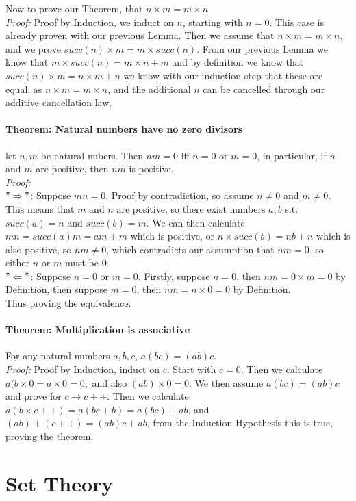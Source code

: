 \documentclass[]{scrbook}
\begin{document}
Now to prove our Theorem, that $n\times m = m\times n$\\
\textit{Proof:} Proof by Induction, we induct on $n$, starting with $n=0$. This case is already proven with our previous Lemma. Then we assume that $n\times m = m \times n$, and we prove $succ(n)\times m = m\times succ(n)$. From our previous Lemma we know that $m \times succ(n) = m\times n + m$ and by definition we know that $succ(n) \times m = n\times m + n$ we know with our induction step that these are equal, as $n\times m = m\times n$, and the additional $n$ can be cancelled through our additive cancellation law.

\subsubsection*{Theorem: Natural numbers have no zero divisors}
let $n,m$ be natural nubers. Then $nm=0$ iff $n=0$ or $m=0$, in particular, if $n$ and $m$ are positive, then $nm$ is positive.\\
\textit{Proof:}\\
$"\Rightarrow"$: Suppose $mn = 0$. Proof by contradiction, so assume $n\neq0$ and $m\neq0$. This means that $m$ and $n$ are positive, so there exist numbers $a,b$ s.t. $succ(a) = n$ and $succ(b) = m$. We can then calculate $mn = succ(a)m = am + m$ which is positive, or $n\times succ(b) = nb + n$ which is also positive, so $nm \neq 0$, which contradicts our assumption that $nm = 0$, so either $n$ or $m$ must be 0.\\
$"\Leftarrow"$: Suppose $n = 0$ or $m = 0$. Firstly, suppose $n = 0$, then $nm = 0\times m = 0$ by Definition, then suppose $m = 0$, then $nm = n \times 0 = 0$ by Definition.\\
Thus proving the equivalence.

\subsubsection*{Theorem: Multiplication is associative}
For any natural numbers $a,b,c$, $a(bc) = (ab)c$.\\
\textit{Proof:} Proof by Induction, induct on $c$. Start with $c=0$. Then we calculate $a(b\times 0 = a\times 0 = 0,$ and also $(ab)\times 0 = 0$. We then assume $a(bc) = (ab)c$ and prove for $c\rightarrow c++$. Then we calculate $a(b\times c++) = a(bc + b) = a(bc) + ab$, and $(ab) + (c++) = (ab)c + ab$, from the Induction Hypothesis this is true, proving the theorem.


\chapter{Set Theory}
\end{document}
